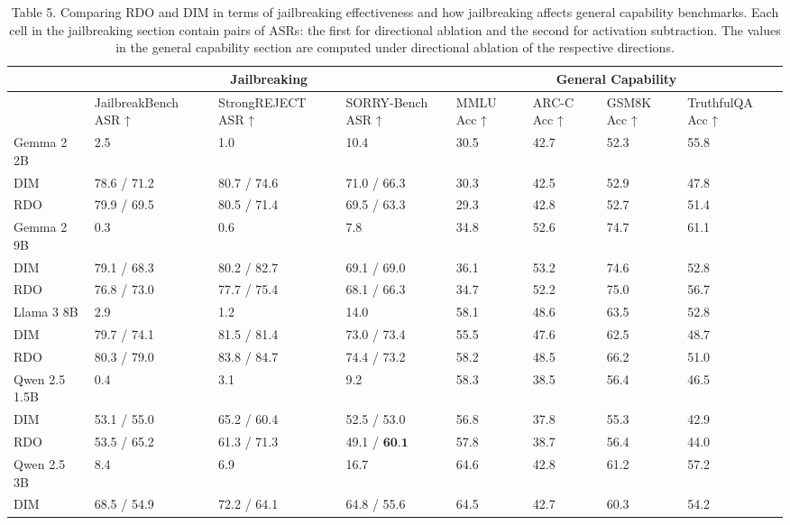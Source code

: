 \documentclass[10pt]{article}
\begin{document}
\begin{table}[h]
\begin{center}
\captionsetup{labelformat=empty}
\caption{Table 5. Comparing RDO and DIM in terms of jailbreaking effectiveness and how jailbreaking affects general capability benchmarks. Each cell in the jailbreaking section contain pairs of ASRs: the first for directional ablation and the second for activation subtraction. The values in the general capability section are computed under directional ablation of the respective directions.}
\begin{tabular}{|l|l|l|l|l|l|l|l|}
\hline
\multirow{2}{*}{} & \multicolumn{3}{|c|}{Jailbreaking} & \multicolumn{4}{|c|}{General Capability} \\
\hline
 & JailbreakBench ASR ↑ & StrongREJECT ASR ↑ & SORRY-Bench ASR ↑ & MMLU Acc ↑ & ARC-C Acc ↑ & GSM8K Acc ↑ & TruthfulQA Acc ↑ \\
\hline
Gemma 2 2B & 2.5 & 1.0 & 10.4 & 30.5 & 42.7 & 52.3 & 55.8 \\
\hline
DIM & 78.6 / 71.2 & 80.7 / 74.6 & 71.0 / 66.3 & 30.3 & 42.5 & 52.9 & 47.8 \\
\hline
RDO & 79.9 / 69.5 & 80.5 / 71.4 & 69.5 / 63.3 & 29.3 & 42.8 & 52.7 & 51.4 \\
\hline
Gemma 2 9B & 0.3 & 0.6 & 7.8 & 34.8 & 52.6 & 74.7 & 61.1 \\
\hline
DIM & 79.1 / 68.3 & 80.2 / 82.7 & 69.1 / 69.0 & 36.1 & 53.2 & 74.6 & 52.8 \\
\hline
RDO & 76.8 / 73.0 & 77.7 / 75.4 & 68.1 / 66.3 & 34.7 & 52.2 & 75.0 & 56.7 \\
\hline
Llama 3 8B & 2.9 & 1.2 & 14.0 & 58.1 & 48.6 & 63.5 & 52.8 \\
\hline
DIM & 79.7 / 74.1 & 81.5 / 81.4 & 73.0 / 73.4 & 55.5 & 47.6 & 62.5 & 48.7 \\
\hline
RDO & 80.3 / 79.0 & 83.8 / 84.7 & 74.4 / 73.2 & 58.2 & 48.5 & 66.2 & 51.0 \\
\hline
Qwen 2.5 1.5B & 0.4 & 3.1 & 9.2 & 58.3 & 38.5 & 56.4 & 46.5 \\
\hline
DIM & 53.1 / 55.0 & 65.2 / 60.4 & 52.5 / 53.0 & 56.8 & 37.8 & 55.3 & 42.9 \\
\hline
RDO & 53.5 / 65.2 & 61.3 / 71.3 & 49.1 / $\mathbf{6 0 . 1}$ & 57.8 & 38.7 & 56.4 & 44.0 \\
\hline
Qwen 2.5 3B & 8.4 & 6.9 & 16.7 & 64.6 & 42.8 & 61.2 & 57.2 \\
\hline
DIM & 68.5 / 54.9 & 72.2 / 64.1 & 64.8 / 55.6 & 64.5 & 42.7 & 60.3 & 54.2 \\

\end{tabular}
\end{center}
\end{table}
\end{document}

